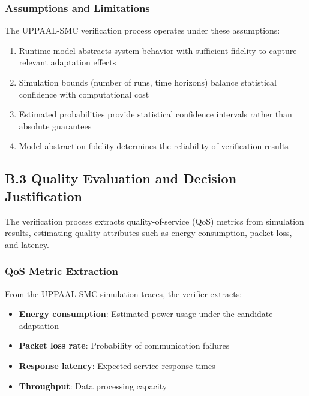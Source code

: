 \documentclass[11pt,a4paper]{article}
\begin{document}
\subsubsection{Assumptions and Limitations}

The UPPAAL-SMC verification process operates under these assumptions:

\begin{enumerate}
    \item Runtime model abstracts system behavior with sufficient fidelity to capture relevant adaptation effects
    \item Simulation bounds (number of runs, time horizons) balance statistical confidence with computational cost
    \item Estimated probabilities provide statistical confidence intervals rather than absolute guarantees
    \item Model abstraction fidelity determines the reliability of verification results
\end{enumerate}


\subsection{B.3 Quality Evaluation and Decision Justification}
\label{app:quality-evaluation}

The verification process extracts quality-of-service (QoS) metrics from simulation results, estimating quality attributes such as energy consumption, packet loss, and latency.

\subsubsection{QoS Metric Extraction}

From the UPPAAL-SMC simulation traces, the verifier extracts:

\begin{itemize}
    \item \textbf{Energy consumption}: Estimated power usage under the candidate adaptation
    \item \textbf{Packet loss rate}: Probability of communication failures
    \item \textbf{Response latency}: Expected service response times
    \item \textbf{Throughput}: Data processing capacity
\end{itemize}
\end{document}
